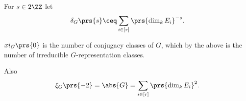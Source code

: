 \documentclass[10pt,a4paper,twoside,openany,hidelinks]{book}
\begin{document}
\begin{definition}
For $s \in 2\ZZ$ let \[\delta_G\prs{s} \ceq \sum_{i \in [r]} \prs{\dim_k E_i}^{-s} \text{.}\]
\end{definition}

\begin{corollary}
$xi_G\prs{0}$ is the number of conjugacy classes of $G$, which by the above is the number of irreducible $G$-representation classes.

Also \[\xi_G\prs{-2} = \abs{G} = \sum_{i \in [r]} \prs{\dim_k E_i}^2 \text{.}\]
\end{corollary}

\begin{comment}
\begin{thebibliography}{2}
\bibitem{context} 
Emily Riehl. 
\textit{Category Theory in Context}. 

\bibitem{nlab}
\textit{nLab - Online Wiki with Focus on Category Theory and Homotopy Theory}.\\
\href{https://ncatlab.org/nlab/show/HomePage}{https://ncatlab.org/nlab/show/HomePage}
\end{thebibliography}
\end{comment}

\backmatter
\end{document}
